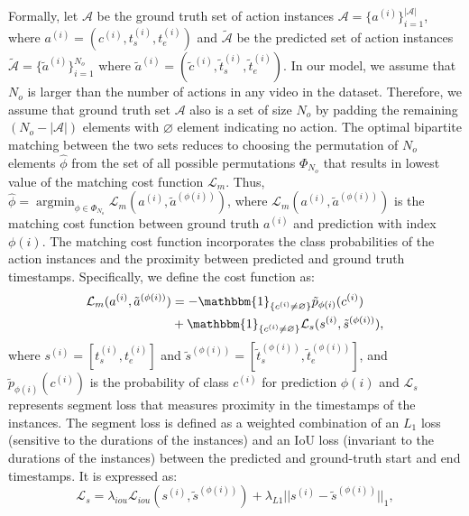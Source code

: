 \documentclass[10pt,twocolumn,letterpaper]{article}
\begin{document}
Formally, let $\mathcal{A}$ be the ground truth set of action instances $\mathcal{A} = \{a^{(i)}\}^{|\mathcal{A}|}_{i=1}$, where $a^{(i)}= (c^{(i)}, t^{(i)}_s, t^{(i)}_e)$ and $\mathcal{\tilde A}$ be the predicted set of action instances $\mathcal{\tilde A} = \{\tilde a^{(i)}\}^{N_o}_{i=1}$ where $ \tilde a^{(i)}= (\tilde c^{(i)}, \tilde t^{(i)}_s,  \tilde t^{(i)}_e)$. 
In our model, we assume that $N_o$ is larger than the number of actions in any video in the dataset. Therefore, we assume that ground truth set $\mathcal{A}$ also is a set of size $N_o$ by padding the remaining $(N_o - |\mathcal{A}|)$ elements with $\varnothing$ element indicating no action. The optimal bipartite matching between the two sets reduces to choosing the permutation of $N_o$ elements $\hat \phi$ from the set of all possible permutations $\Phi_{N_o}$ that results in lowest value of the matching cost function $\mathcal{L}_{m}$. 
Thus, 
$ \hat \phi = \operatorname*{argmin}_{\phi \in \Phi_{N_o}} \mathcal{L}_{m}(a^{(i)},\tilde a^{(\phi(i))})$,
where $\mathcal{L}_{m}(a^{(i)},\tilde a^{(\phi(i))})$ is the matching cost function between ground truth $a^{(i)}$ and prediction with index $\phi(i)$. The matching cost function
incorporates the class probabilities of the action instances and the proximity between predicted and ground truth timestamps. Specifically, we define the cost function as:
\begin{equation}
\begin{split}
    \mathcal{L}_{m}(a^{(i)},\tilde a^{(\phi(i))}) & = - \mathbbm{1}_{\{c^{(i)} \neq \varnothing\}} \tilde p_{\phi(i)}(c^{(i)})  \\
    & + \mathbbm{1}_{\{c^{(i)} \neq \varnothing\}} \mathcal{L}_s(s^{(i)}, \tilde  s^{(\phi(i))}),
    \end{split}
\end{equation} 
where $s^{(i)} = [t^{(i)}_s, t^{(i)}_e]$ and $\tilde s^{(\phi(i))} = [\tilde t^{(\phi(i))}_s, \tilde t^{(\phi(i))}_e]$, and
$\tilde p_{\phi(i)}(c^{(i)})$ is the probability of class $c^{(i)}$ for prediction $\phi(i)$ and $\mathcal{L}_{s}$ represents segment loss that measures proximity in the timestamps of the instances. 
The segment loss is defined as a weighted combination of an $L_1$ loss (sensitive to the durations of the instances) and an IoU loss (invariant to the durations of the instances) between the predicted and ground-truth start and end timestamps. It is expressed as:
\begin{equation}
    \mathcal{L}_s = \lambda_{iou} \mathcal{L}_{iou}(s^{(i)}, \tilde s^{(\phi(i))})
     + \lambda_{L1} ||s^{(i)} - \tilde s^{(\phi(i))}||_{1} ,
\end{equation}
\end{document}
